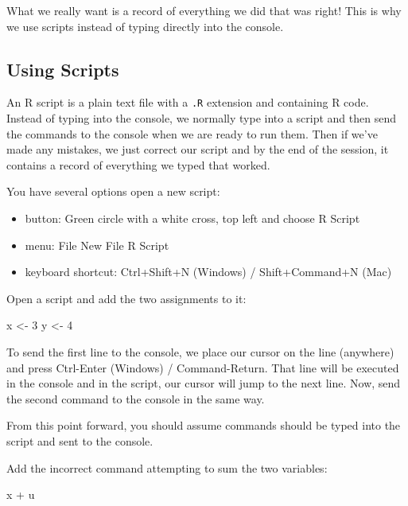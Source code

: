 \documentclass[
  letterpaper,
  DIV=11,
  numbers=noendperiod]{scrreprt}
\newenvironment{Shaded}{\begin{snugshade}}{\end{snugshade}}
\newcommand{\DecValTok}[1]{\textcolor[rgb]{0.68,0.00,0.00}{#1}}
\newcommand{\NormalTok}[1]{\textcolor[rgb]{0.00,0.23,0.31}{#1}}
\newcommand{\OtherTok}[1]{\textcolor[rgb]{0.00,0.23,0.31}{#1}}
\newcommand{\SpecialCharTok}[1]{\textcolor[rgb]{0.37,0.37,0.37}{#1}}
\providecommand{\tightlist}{%
  \setlength{\itemsep}{0pt}\setlength{\parskip}{0pt}}\usepackage{longtable,booktabs,array}
\begin{document}
What we really want is a record of everything we did that was right!
This is why we use scripts instead of typing directly into the console.

\hypertarget{using-scripts}{%
\subsection{Using Scripts}\label{using-scripts}}

An R script is a plain text file with a \texttt{.R} extension and
containing R code. Instead of typing into the console, we normally type
into a script and then send the commands to the console when we are
ready to run them. Then if we've made any mistakes, we just correct our
script and by the end of the session, it contains a record of everything
we typed that worked.

You have several options open a new script:

\begin{itemize}
\tightlist
\item
  button: Green circle with a white cross, top left and choose R Script
\item
  menu: File \textbar{} New File \textbar{} R Script
\item
  keyboard shortcut: Ctrl+Shift+N (Windows) / Shift+Command+N (Mac)
\end{itemize}

Open a script and add the two assignments to it:

\begin{Shaded}
\begin{Highlighting}[]
\NormalTok{x }\OtherTok{\textless{}{-}} \DecValTok{3}
\NormalTok{y }\OtherTok{\textless{}{-}} \DecValTok{4}
\end{Highlighting}
\end{Shaded}

To send the first line to the console, we place our cursor on the line
(anywhere) and press Ctrl-Enter (Windows) / Command-Return. That line
will be executed in the console and in the script, our cursor will jump
to the next line. Now, send the second command to the console in the
same way.

From this point forward, you should assume commands should be typed into
the script and sent to the console.

Add the incorrect command attempting to sum the two variables:

\begin{Shaded}
\begin{Highlighting}[]
\NormalTok{x }\SpecialCharTok{+}\NormalTok{ u}
\end{Highlighting}
\end{Shaded}
\end{document}
